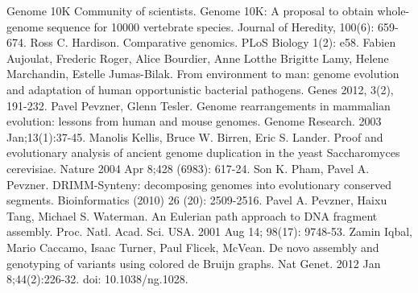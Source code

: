 \documentclass[a4paper,12pt]{scrartcl}
\begin{document}
\begin{thebibliography}{9}
	Genome 10K Community of scientists.
	Genome 10K: A proposal to obtain whole-genome sequence for 10000 vertebrate species.
	Journal of Heredity, 100(6): 659-674.
	Ross C. Hardison.
	Comparative genomics.
	PLoS Biology 1(2): e58.
	Fabien Aujoulat, Frederic Roger, Alice Bourdier, Anne Lotthe  Brigitte Lamy, Helene Marchandin, Estelle Jumas-Bilak.
	From environment to man: genome evolution and adaptation of human opportunistic bacterial pathogens.
	Genes 2012, 3(2), 191-232.
	Pavel Pevzner, Glenn Tesler.
	Genome rearrangements in mammalian evolution: lessons from human and mouse genomes.
	Genome Research. 2003 Jan;13(1):37-45.
	Manolis Kellis, Bruce W. Birren, Eric S. Lander.
	Proof and evolutionary analysis of ancient genome duplication in the yeast Saccharomyces cerevisiae.
	Nature 2004 Apr 8;428 (6983): 617-24.
	Son K. Pham, Pavel A. Pevzner.
	DRIMM-Synteny: decomposing genomes into evolutionary conserved segments.
	Bioinformatics (2010)  26  (20):  2509-2516.
	Pavel A. Pevzner, Haixu Tang, Michael S. Waterman.
	An Eulerian path approach to DNA fragment assembly.
	Proc. Natl. Acad. Sci. USA. 2001 Aug 14; 98(17): 9748-53.
	Zamin Iqbal, Mario Caccamo, Isaac Turner, Paul Flicek, McVean.
	De novo assembly and genotyping of variants using colored de Bruijn graphs.
	Nat Genet. 2012 Jan 8;44(2):226-32. doi: 10.1038/ng.1028.
\end{thebibliography}
\end{document}
